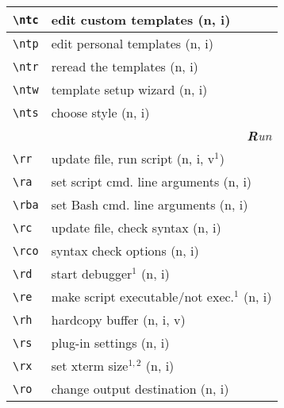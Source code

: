 \documentclass[oneside,11pt,landscape,DIV16]{scrartcl}
\begin{document}
\begin{multicols}{3}
\begin{center}
\begin{tabular}[]{|p{11mm}|p{62mm}|}
\hline \verb'\ntc' & edit custom templates     \hfill (n, i)\\
\hline \verb'\ntp' & edit personal templates   \hfill (n, i)\\
\hline \verb'\ntr' & reread the templates      \hfill (n, i)\\
\hline \verb'\ntw' & template setup wizard     \hfill (n, i)\\
\hline \verb'\nts' & choose style              \hfill (n, i)\\
\hline
\hline
\multicolumn{2}{|r|}{\textsl{\textbf{R}un}} \\[1.0ex]
\hline \verb'\rr'  & update file, run script              \hfill (n, i, v$^1$)\\
\hline \verb'\ra'  & set script cmd. line arguments       \hfill (n, i)\\
\hline \verb'\rba' & set Bash cmd. line arguments         \hfill (n, i)\\
\hline \verb'\rc'  & update file, check syntax            \hfill (n, i)\\
\hline \verb'\rco' & syntax check options                 \hfill (n, i)\\
\hline \verb'\rd'  & start debugger$^1$                   \hfill (n, i)\\
\hline \verb'\re'  & make script executable/not exec.$^1$ \hfill (n, i)\\
\hline \verb'\rh'  & hardcopy buffer                      \hfill (n, i, v)\\
\hline \verb'\rs'  & plug-in settings                     \hfill (n, i)\\
\hline \verb'\rx'  & set xterm size$^{1,2}$               \hfill (n, i)\\
\hline \verb'\ro'  & change output destination            \hfill (n, i)\\
\hline
\end{tabular}\\
%
%
\end{center}%
\end{multicols}%
%
\end{document}
